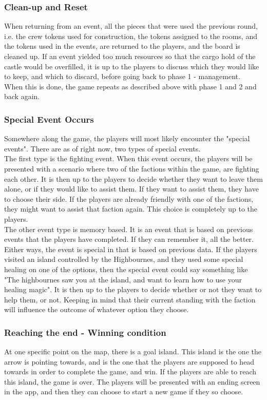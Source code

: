 \subsubsection{Clean-up and Reset}

When returning from an event, all the pieces that were used the previous round, i.e. the crew tokens used for construction, the tokens assigned to the rooms, and the tokens used in the events, are returned to the players, and the board is cleaned up.
If an event yielded too much resources so that the cargo hold of the castle would be overfilled, it is up to the players to discuss which they would like to keep, and which to discard, before going back to phase 1 - management.\\
When this is done, the game repeats as described above with phase 1 and 2 and back again.

\subsubsection{Special Event Occurs}

Somewhere along the game, the players will most likely encounter the "special events". There are as of right now, two types of special events.\\
The first type is the fighting event. When this event occurs, the players will be presented with a scenario where two of the factions within the game, are fighting each other. It is then up to the players to decide whether they want to leave them alone, or if they would like to assist them. If they want to assist them, they have to choose their side. If the players are already friendly with one of the factions, they might want to assist that faction again. This choice is completely up to the players.\\
The other event type is memory based. It is an event that is based on previous events that the players have completed. If they can remember it, all the better. Either ways, the event is special in that is based on previous data. If the players visited an island controlled by the Highbournes, and they used some special healing on one of the options, then the special event could say something like "The highbournes saw you at the island, and want to learn how to use your healing magic". It is then up to the players to decide whether or not they want to help them, or not. Keeping in mind that their current standing with the faction will influence the outcome of whatever option they choose. 

\subsubsection{Reaching the end - Winning condition}
At one specific point on the map, there is a goal island. This island is the one the arrow is pointing towards, and is the one that the players are supposed to head towards in order to complete the game, and win.
If the players are able to reach this island, the game is over. The players will be presented with an ending screen in the app, and then they can choose to start a new game if they so choose. 

